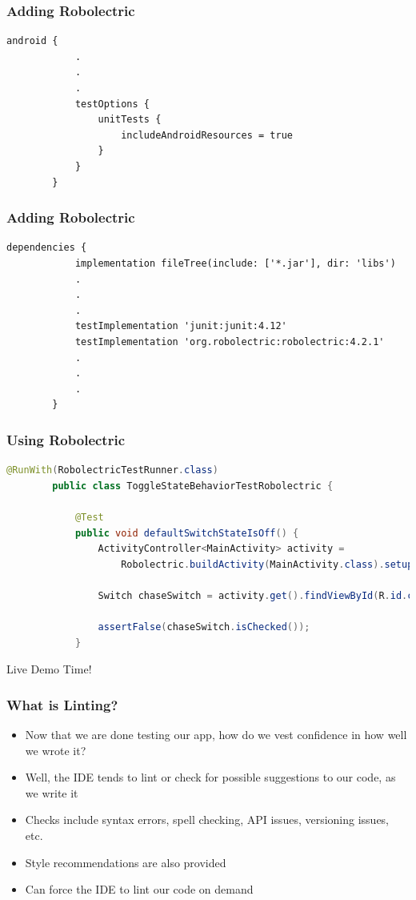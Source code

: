 \documentclass[10pt]{beamer}
\begin{document}
\begin{frame}[fragile]
    \frametitle{Adding Robolectric}
    \begin{lstlisting}[caption={build.gradle}]
        android {
            .
            .
            .
            testOptions {
                unitTests {
                    includeAndroidResources = true
                }
            }
        }
    \end{lstlisting}
\end{frame}

\begin{frame}[fragile]
    \frametitle{Adding Robolectric}
    \begin{lstlisting}[caption={build.gradle}]
        dependencies {
            implementation fileTree(include: ['*.jar'], dir: 'libs')
            .
            .
            .
            testImplementation 'junit:junit:4.12'
            testImplementation 'org.robolectric:robolectric:4.2.1'
            .
            .
            .
        }
    \end{lstlisting}
\end{frame}

\begin{frame}[fragile]
    \frametitle{Using Robolectric}
    \begin{lstlisting}[language=java, caption={ToggleStateBehaviorTestRobolectric.java}]
        @RunWith(RobolectricTestRunner.class)
        public class ToggleStateBehaviorTestRobolectric {

            @Test
            public void defaultSwitchStateIsOff() {
                ActivityController<MainActivity> activity =
                    Robolectric.buildActivity(MainActivity.class).setup();

                Switch chaseSwitch = activity.get().findViewById(R.id.chase_switch);

                assertFalse(chaseSwitch.isChecked());
            }
    \end{lstlisting}
    Live Demo Time!
\end{frame}

\begin{frame}
    \frametitle{What is Linting?}
    \begin{itemize}
        \item Now that we are done testing our app,
        how do we vest confidence in how well we wrote it?
        \item Well, the IDE tends to lint or check for possible suggestions to our code,
        as we write it
        \item Checks include syntax errors, spell checking, API issues, versioning issues, etc.
        \item Style recommendations are also provided
        \item Can force the IDE to lint our code on demand
    \end{itemize}
\end{frame}
\end{document}

